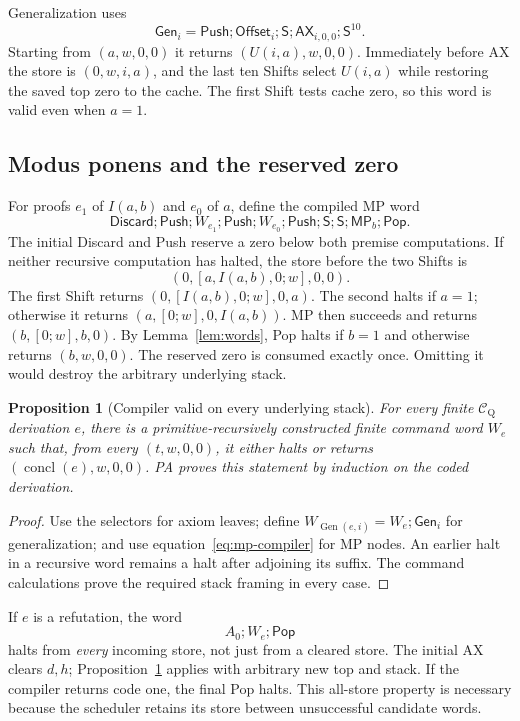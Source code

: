\documentclass[11pt,letterpaper]{article}
\newcommand{\CQ}{\mathcal C_{\mathrm Q}}
\newtheorem{proposition}[theorem]{Proposition}
\begin{document}
Generalization uses
\[
 \mathsf{Gen}_i=
 \mathsf{Push};\mathsf{Offset}_i;\mathsf S;
             \mathsf{AX}_{i,0,0};\mathsf S^{10}.
\]
Starting from $(a,w,0,0)$ it returns $(U(i,a),w,0,0)$.
Immediately before AX the store is $(0,w,i,a)$, and the last ten
Shifts select $U(i,a)$ while restoring the saved top zero to the cache.
The first Shift tests cache zero, so this word is valid even when $a=1$.

\subsection{Modus ponens and the reserved zero}

For proofs $e_1$ of $I(a,b)$ and $e_0$ of $a$, define the compiled MP word
\begin{equation}\label{eq:mp-compiler}
 \mathsf{Discard};\mathsf{Push};W_{e_1};\mathsf{Push};
 W_{e_0};\mathsf{Push};\mathsf S;\mathsf S;\mathsf{MP}_b;\mathsf{Pop}.
\end{equation}
The initial Discard and Push reserve a zero below both premise
computations. If neither recursive computation has halted, the store
before the two Shifts is
\[
                 (0,[a,I(a,b),0;w],0,0).
\]
The first Shift returns $(0,[I(a,b),0;w],0,a)$. The second halts if
$a=1$; otherwise it returns $(a,[0;w],0,I(a,b))$. MP then succeeds
and returns $(b,[0;w],b,0)$. By Lemma~\ref{lem:words}, Pop halts if
$b=1$ and otherwise returns $(b,w,0,0)$. The reserved zero is consumed
exactly once. Omitting it would destroy the arbitrary underlying stack.

\begin{proposition}[Compiler valid on every underlying stack]\label{prop:compile}
For every finite $\CQ$ derivation $e$, there is a primitive-recursively
constructed finite command word $W_e$ such that, from every
$(t,w,0,0)$, it either halts or returns
$(\operatorname{concl}(e),w,0,0)$. PA proves this statement by induction
on the coded derivation.
\end{proposition}
\begin{proof}
Use the selectors for axiom leaves; define
$W_{\operatorname{Gen}(e,i)}=W_e;\mathsf{Gen}_i$ for generalization;
and use equation~\eqref{eq:mp-compiler} for MP nodes. An earlier halt in a
recursive word remains a halt after adjoining its suffix. The command
calculations prove the required stack framing in every case.
\end{proof}

If $e$ is a refutation, the word
\begin{equation}\label{eq:allstore}
                  A_0;W_e;\mathsf{Pop}
\end{equation}
halts from \emph{every} incoming store, not just from a cleared store.
The initial AX clears $d,h$; Proposition~\ref{prop:compile} applies
with arbitrary new top and stack. If the compiler returns code one,
the final Pop halts. This all-store property is necessary because the
scheduler retains its store between unsuccessful candidate words.
\end{document}

